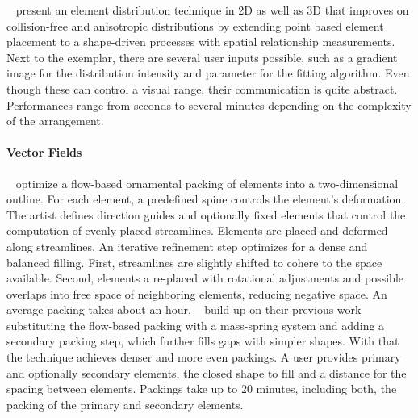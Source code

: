 \citeauthor*{landes_2013_asm}~\cite{landes_2013_asm} present an element distribution technique in 2D as well as 3D that improves on collision-free and anisotropic distributions by extending point based element placement to a shape-driven processes with spatial relationship measurements. Next to the exemplar, there are several user inputs possible, such as a gradient image for the distribution intensity and parameter for the fitting algorithm. Even though these can control a visual range, their communication is quite abstract. Performances range from seconds to several minutes depending on the complexity of the arrangement. 


\paragraph*{Vector Fields}
\label{para:analysis_element_arrangements_vector}

\citeauthor*{saputra_2017_ffo}~\cite{saputra_2017_ffo} optimize a flow-based ornamental packing of elements into a two-dimensional outline. For each element, a predefined spine controls the element's deformation. The artist defines direction guides and optionally fixed elements that control the computation of evenly placed streamlines. Elements are placed and deformed along streamlines. An iterative refinement step optimizes for a dense and balanced filling. First, streamlines are slightly shifted to cohere to the space available. Second, elements a re-placed with rotational adjustments and possible overlaps into free space of neighboring elements, reducing negative space. An average packing takes about an hour. \citeauthor*{saputra_2018_rde}~\cite{saputra_2018_rde} build up on their previous work substituting the flow-based packing with a mass-spring system and adding a secondary packing step, which further fills gaps with simpler shapes. With that the technique achieves denser and more even packings. A user provides primary and optionally secondary elements, the closed shape to fill and a distance for the spacing between elements. Packings take up to 20 minutes, including both, the packing of the primary and secondary elements.


